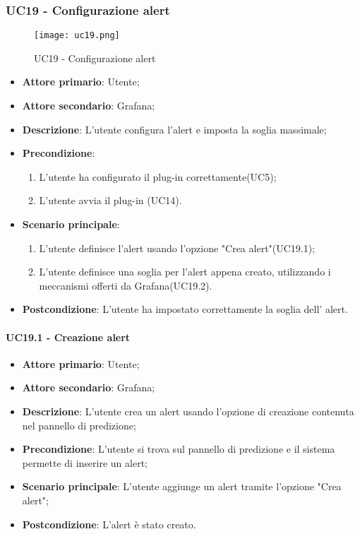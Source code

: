 \subsubsection{UC19 - Configurazione alert}
\label{sssec:uc19}

\begin{figure}[h!]
  \begin{center}
    \texttt{[image: uc19.png]}\\
    \caption{UC19 - Configurazione alert}%
    \label{fig:uc19}
  \end{center}
  \end{figure}

\begin{itemize}
  \item \textbf{Attore primario}: Utente;
  \item \textbf{Attore secondario}: Grafana;
  \item \textbf{Descrizione}: L'utente configura l'alert e imposta la soglia massimale;
  \item \textbf{Precondizione}:
  \begin{enumerate}
		\item L'utente ha configurato il plug-in correttamente(UC5);
		\item L'utente avvia il plug-in (UC14).
	\end {enumerate}
  \item \textbf{Scenario principale}:
  \begin{enumerate}
    \item L'utente definisce l'alert usando l'opzione "Crea alert"(UC19.1);
    \item L'utente definisce una soglia per l'alert appena creato, utilizzando i meccanismi offerti da Grafana(UC19.2).
  \end{enumerate}
  \item \textbf{Postcondizione}: L'utente ha impostato correttamente la soglia dell' alert.
\end{itemize}


\paragraph{UC19.1 - Creazione alert}
\label{para:uc19.1}
\begin{itemize}
  \item \textbf{Attore primario}: Utente;
  \item \textbf{Attore secondario}: Grafana;
  \item \textbf{Descrizione}: L'utente crea un alert usando l'opzione di creazione contenuta nel pannello di predizione;
  \item \textbf{Precondizione}: L'utente si trova sul pannello di predizione e il sistema permette di inserire un alert;
  \item \textbf{Scenario principale}: L'utente aggiunge un alert tramite l'opzione "Crea alert";
  \item \textbf{Postcondizione}: L'alert è stato creato.
\end{itemize}


